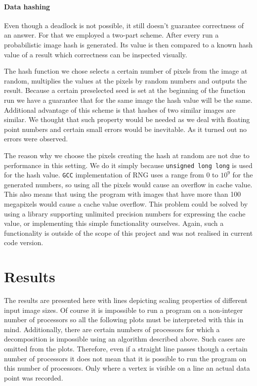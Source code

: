 \documentclass[11pt,a4paper]{article}
\begin{document}
\paragraph{Data hashing}
Even though a deadlock is not possible, it still doesn't guarantee correctness of an answer.
For that we employed a two-part scheme.
After every run a probabilistic image hash is generated.
Its value is then compared to a known hash value of a result which correctness can be inspected visually.

The hash function we chose selects a certain number of pixels from the image at random, multiplies the values at the pixels by random numbers and outputs the result.
Because a certain preselected seed is set at the beginning of the function run we have a guarantee that for the same image the hash value will be the same.
Additional advantage of this scheme is that hashes of two similar images are similar.
We thought that such property would be needed as we deal with floating point numbers and certain small errors would be inevitable.
As it turned out no errors were observed.

The reason why we choose the pixels creating the hash at random are not due to performance in this setting.
We do it simply because \texttt{unsigned long long} is used for the hash value.
\texttt{GCC} implementation of RNG uses a range from $0$ to $10^9$ for the generated numbers, so using all the pixels would cause an overflow in cache value.
This also means that using the program with images that have more than 100 megapixels would cause a cache value overflow.
This problem could be solved by using a library supporting unlimited precision numbers for expressing the cache value, or implementing this simple functionality ourselves.
Again, such a functionality is outside of the scope of this project and was not realised in current code version.


\section{Results}
The results are presented here with lines depicting scaling properties of different input image sizes.
Of course it is impossible to run a program on a non-integer number of processors so all the following plots must be interpreted with this in mind.
Additionally, there are certain numbers of processors for which a decomposition is impossible using an algorithm described above.
Such cases are omitted from the plots.
Therefore, even if a straight line passes though a certain number of processors it does not mean that it is possible to run the program on this number of processors.
Only where a vertex is visible on a line an actual data point was recorded.
\end{document}
